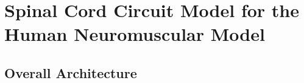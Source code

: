 %
%


\section{Spinal Cord Circuit Model for the Human Neuromuscular Model}
\label{sec:spinal-cpg}

\subsection{Overall Architecture}
\label{sec:spinal-cpg-arch}

